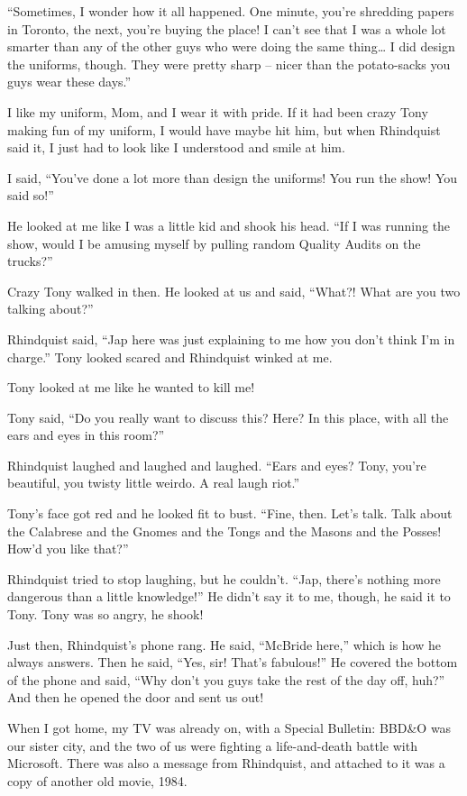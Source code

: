“Sometimes, I wonder how it all happened. One minute, you're 
shredding papers in Toronto, the next, you're buying the place! I can't 
see that I was a whole lot smarter than any of the other guys who were 
doing the same thing\ldots{} I did design the uniforms, though. They were 
pretty sharp -- nicer than the potato-sacks you guys wear these days.”

I like my uniform, Mom, and I wear it with pride. If it had been crazy 
Tony making fun of my uniform, I would have maybe hit him, but when 
Rhindquist said it, I just had to look like I understood and smile at 
him.

I said, “You've done a lot more than design the uniforms! You run the 
show! You said so!”

He looked at me like I was a little kid and shook his head. “If I was 
running the show, would I be amusing myself by pulling random Quality 
Audits on the trucks?”

Crazy Tony walked in then. He looked at us and said, “What?! What are 
you two talking about?”

Rhindquist said, “Jap here was just explaining to me how you don't 
think I'm in charge.” Tony looked scared and Rhindquist winked at me.

Tony looked at me like he wanted to kill me!

Tony said, “Do you really want to discuss this? Here? In this place, 
with all the ears and eyes in this room?”

Rhindquist laughed and laughed and laughed. “Ears and eyes? Tony, 
you're beautiful, you twisty little weirdo. A real laugh riot.”

Tony's face got red and he looked fit to bust. “Fine, then. Let's 
talk. Talk about the Calabrese and the Gnomes and the Tongs and the 
Masons and the Posses! How'd you like that?”

Rhindquist tried to stop laughing, but he couldn't. “Jap, there's 
nothing more dangerous than a little knowledge!” He didn't say it to 
me, though, he said it to Tony. Tony was so angry, he shook!

Just then, Rhindquist's phone rang. He said, “McBride here,” which 
is how he always answers. Then he said, “Yes, sir! That's 
fabulous!” He covered the bottom of the phone and said, “Why don't 
you guys take the rest of the day off, huh?” And then he opened the 
door and sent us out!

When I got home, my TV was already on, with a Special Bulletin: 
BBD{\&}O was our sister city, and the two of us were fighting a 
life-and-death battle with Microsoft. There was also a message from 
Rhindquist, and attached to it was a copy of another old movie, 1984.

